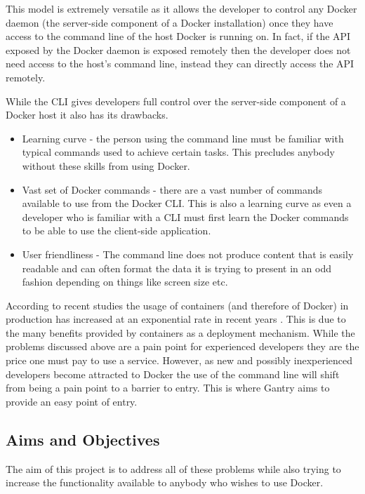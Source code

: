 This model is extremely versatile as it allows the developer to control any \gls{Docker daemon} (the server-side component of a Docker installation) once they have access to the command line of the host Docker is running on. In fact, if the API exposed by the Docker daemon is exposed remotely then the developer does not need access to the host's command line, instead they can directly access the API remotely.

While the \gls{CLI} gives developers full control over the server-side component of a \gls{Docker host} it also has its drawbacks.

\begin{itemize}
	\item Learning curve - the person using the command line must be familiar with typical commands used to achieve certain tasks. This precludes anybody without these skills from using Docker.
	\item Vast set of Docker commands - there are a vast number of commands available to use from the Docker CLI. This is also a learning curve as even a developer who is familiar with a CLI must first learn the Docker commands to be able to use the client-side application. 
	\item User friendliness - The command line does not produce content that is easily readable and can often format the data it is trying to present in an odd fashion depending on things like screen size etc.
\end{itemize}

According to recent studies the usage of containers (and therefore of Docker) in production has increased at an exponential rate in recent years \citep{DockerUsage2016}. This is due to the many benefits provided by containers as a deployment mechanism. While the problems discussed above are a pain point for experienced developers they are the price one must pay to use a service. However, as new and possibly inexperienced developers become attracted to Docker the use of the command line will shift from being a pain point to a barrier to entry. This is where Gantry aims to provide an easy point of entry.

\subsection{Aims and Objectives}
\label{sub:aims}
The aim of this project is to address all of these problems while also trying to increase the functionality available to anybody who wishes to use Docker.

